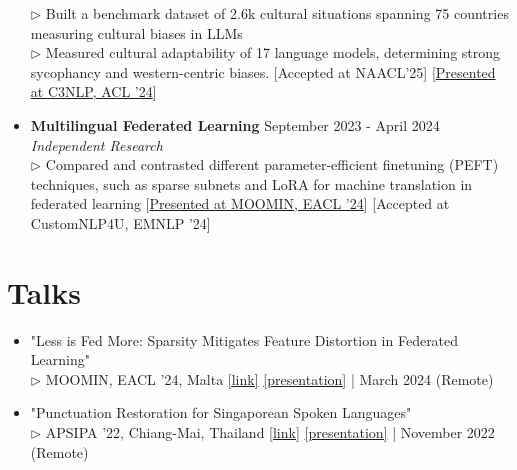 \documentclass[11pt,letterpaper]{article}
\begin{document}
\begin{itemize}[leftmargin=*,label={},itemsep=6pt]
            $\triangleright$ 
                Built a benchmark dataset of 2.6k cultural situations spanning 75 countries measuring cultural biases in
                LLMs
            \\
            $\triangleright$ 
                Measured cultural adaptability of 17 language models, determining strong sycophancy and western-centric
                biases. [Accepted at NAACL'25] [\href{https://c3nlp.github.io/}{Presented at C3NLP,
                    ACL '24}]
            \\
        \item \textbf{Multilingual Federated Learning} \hfill September 2023 - April 2024\\
            \textit{Independent Research}\\
            $\triangleright$ 
                Compared and contrasted different parameter-efficient finetuning (PEFT) techniques, such as sparse
                subnets and LoRA for machine translation in federated learning [\href{https://moomin.eacl.org/}{Presented at MOOMIN, EACL '24}] [Accepted at CustomNLP4U, EMNLP '24]
            \\
    \end{itemize}
    
    \section*{Talks}
    \begin{itemize}[leftmargin=*,label={},itemsep=4pt]
        \item "Less is Fed More: Sparsity Mitigates Feature Distortion in Federated Learning" \textit{}\\
            $\triangleright$ 
                MOOMIN, EACL '24, Malta  \href{https://moomin.eacl.org/}{[link]} \href{https://docs.google.com/presentation/d/1DmnfMR08y_vW9TXLn8fpqYJkntlPMDuC/edit?usp=sharing}{[presentation]} | March 2024 (Remote)
            \\
        \item "Punctuation Restoration for Singaporean Spoken Languages" \textit{}\\
            $\triangleright$ 
                APSIPA '22, Chiang-Mai, Thailand  \href{https://www.apsipa.org/conference/2022/}{[link]} \href{https://docs.google.com/presentation/d/1DmnfMR08y_vW9TXLn8fpqYJkntlPMDuC/edit?usp=sharing}{[presentation]} | November 2022 (Remote)
            \\
    \end{itemize}
    
\end{document}
